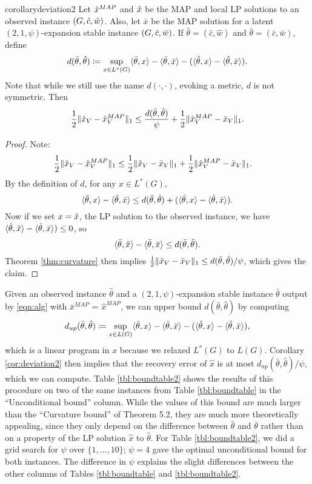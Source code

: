 \begin{restatable}{corollary}{deviation2}\label{cor:deviation2}
Let $\hat{x}^{MAP}$ and $\hat{x}$ be the MAP and local LP solutions to an observed instance $(G,\hat{c},\hat{w})$. Also, let $\bar{x}$ be the MAP solution for a latent $(2,1,\psi)$-expansion stable instance $(G,\bar{c},\bar{w})$. If $\hat{\theta} = (\hat{c},\hat{w})$ and $\bar{\theta} = (\bar{c}, \bar{w})$, define
\[
d(\bar{\theta}, \hat{\theta}) \coloneqq \sup_{x \in L^*(G)} \langle \bar{\theta},x\rangle  - \langle \bar{\theta},\bar{x}\rangle - (\langle \hat{\theta},x\rangle  - \langle \hat{\theta},\bar{x}\rangle).
\]
Note that while we still use the name $d(\cdot, \cdot)$, evoking a metric, $d$ is not symmetric. Then
\[ \frac{1}{2}\lVert \hat{x}_V - \hat{x}^{MAP}_V \rVert_1 \le \frac{d(\bar{\theta}, \hat{\theta})}{\psi} + \frac{1}{2}\lVert \hat{x}_V^{MAP} - \bar{x}_V \rVert_1. \]
\end{restatable}
\begin{proof}
Note:
\begin{align*}
    \frac{1}{2}\lVert \hat{x}_V - \hat{x}_V^{MAP} \rVert_1 &\leq \frac{1}{2}\lVert \hat{x}_V - \bar{x}_V \rVert_1 + \frac{1}{2}\lVert \hat{x}_V^{MAP} - \bar{x}_V \rVert_1.
\end{align*}
By the definition of $d$, for any $x \in L^*(G)$, 
\[\langle \bar{\theta},x\rangle  - \langle \bar{\theta},\bar{x}\rangle \le d(\bar{\theta},\hat{\theta}) + (\langle \hat{\theta},x\rangle  - \langle \hat{\theta},\bar{x}\rangle). \]
Now if we set $x = \hat{x}$, the LP solution to the observed instance, we have $\langle \hat{\theta},\hat{x}\rangle  - \langle \hat{\theta},\bar{x}\rangle) \le 0$, so 
\[
\langle \bar{\theta},\hat{x}\rangle  - \langle \bar{\theta},\bar{x}\rangle \le d(\bar{\theta},\hat{\theta}).
\]
Theorem \ref{thm:curvature} then implies $\frac{1}{2}\lVert \hat{x}_V - \bar{x}_V \rVert_1 \le d(\bar{\theta}, \hat{\theta})/\psi$, which gives the claim.
\end{proof}
Given an observed instance $\hat{\theta}$ and a $(2,1,\psi)$-expansion stable instance $\bar{\theta}$ output by \eqref{eqn:alg} with $\bar{x}^{MAP}$ = $\hat{x}^{MAP}$, we can upper bound $d(\bar{\theta}, \hat{\theta})$ by computing 
\[
d_{up}(\bar{\theta}, \hat{\theta}) \coloneqq \sup_{x \in L(G)} \langle \bar{\theta},x\rangle  - \langle \bar{\theta},\bar{x}\rangle - (\langle \hat{\theta},x\rangle  - \langle \hat{\theta},\bar{x}\rangle),
\]
which is a linear program in $x$ because we relaxed $L^*(G)$ to $L(G)$. Corollary \ref{cor:deviation2} then implies that the recovery error of $\hat{x}$ is at most $d_{up}(\bar{\theta},\hat{\theta}) / \psi$, which we can compute. Table \ref{tbl:boundtable2} shows the results of this procedure on two of the same instances from Table \ref{tbl:boundtable} in the ``Unconditional bound'' column. While the values of this bound are much larger than the ``Curvature bound'' of Theorem 5.2, they are much more theoretically appealing, since they only depend on the difference between $\hat{\theta}$ and $\bar{\theta}$ rather than on a property of the LP solution $\hat{x}$ to $\hat{\theta}$. For Table \ref{tbl:boundtable2}, we did a grid search for $\psi$ over $\{1,\ldots, 10\}$; $\psi=4$ gave the optimal unconditional bound for both instances. The difference in $\psi$ explains the  slight differences between the other columns of Tables \ref{tbl:boundtable} and \ref{tbl:boundtable2}.

